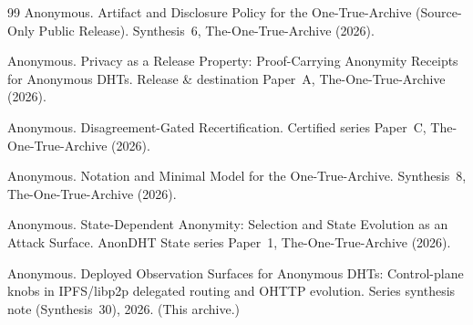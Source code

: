 \documentclass[11pt]{article}
\begin{document}
\begin{thebibliography}{99}
Anonymous.
\newblock Artifact and Disclosure Policy for the One-True-Archive (Source-Only Public Release).
\newblock Synthesis~6, The-One-True-Archive (2026).

Anonymous.
\newblock Privacy as a Release Property: Proof-Carrying Anonymity Receipts for Anonymous DHTs.
\newblock Release \& destination Paper~A, The-One-True-Archive (2026).

Anonymous.
\newblock Disagreement-Gated Recertification.
\newblock Certified series Paper~C, The-One-True-Archive (2026).


Anonymous.
\newblock Notation and Minimal Model for the One-True-Archive.
\newblock Synthesis~8, The-One-True-Archive (2026).


Anonymous.
\newblock State-Dependent Anonymity: Selection and State Evolution as an Attack Surface.
\newblock AnonDHT State series Paper~1, The-One-True-Archive (2026).


Anonymous.
\newblock Deployed Observation Surfaces for Anonymous DHTs: Control-plane knobs in IPFS/libp2p delegated routing and OHTTP evolution.
\newblock Series synthesis note (Synthesis~30), 2026. (This archive.)

\end{thebibliography}
\end{document}
